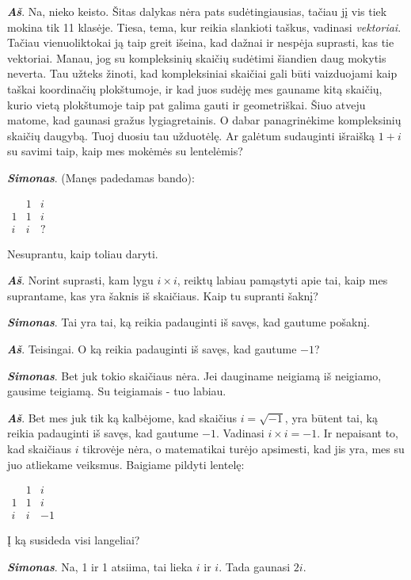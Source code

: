 \documentclass[a4paper]{article}
\newcommand{\say}[1]{\textbf{\textit{#1}}}
\begin{document}
\say{Aš}. Na, nieko keisto. Šitas dalykas nėra pats sudėtingiausias, tačiau jį vis tiek mokina tik 11 klasėje. Tiesa, tema, kur reikia slankioti taškus, vadinasi \textit{vektoriai}. Tačiau vienuoliktokai ją taip greit išeina, kad dažnai ir nespėja suprasti, kas tie vektoriai. Manau, jog su kompleksinių skaičių sudėtimi šiandien daug mokytis neverta. Tau užteks žinoti, kad kompleksiniai skaičiai gali būti vaizduojami kaip taškai koordinačių plokštumoje, ir kad juos sudėję mes gauname kitą skaičių, kurio vietą plokštumoje taip pat galima gauti ir geometriškai. Šiuo atveju matome, kad gaunasi gražus lygiagretainis. O dabar panagrinėkime kompleksinių skaičių daugybą. Tuoj duosiu tau užduotėlę. Ar galėtum sudauginti išraišką $1+i$ su savimi taip, kaip mes mokėmės su lentelėmis?

\say{Simonas}. (Manęs padedamas bando):

$\begin{array}{c||c|c}
 & 1 & i \\ \hline \hline
1 & 1 & i\\ \hline 
 i & i & ?
\end{array}$

Nesuprantu, kaip toliau daryti.

\say{Aš}. Norint suprasti, kam lygu $i \times i$, reiktų labiau pamąstyti apie tai, kaip mes suprantame, kas yra šaknis iš skaičiaus. Kaip tu supranti šaknį?

\say{Simonas}. Tai yra tai, ką reikia padauginti iš savęs, kad gautume pošaknį.

\say{Aš}. Teisingai. O ką reikia padauginti iš savęs, kad gautume $-1$? 

\say{Simonas}. Bet juk tokio skaičiaus nėra. Jei dauginame neigiamą iš neigiamo, gausime teigiamą. Su teigiamais - tuo labiau. 

\say{Aš}. Bet mes juk tik ką kalbėjome, kad skaičius $i=\sqrt{-1}$, yra būtent tai, ką reikia padauginti iš savęs, kad gautume $-1$.  Vadinasi $i\times i = -1$. Ir nepaisant to, kad skaičiaus $i$ tikrovėje nėra, o matematikai turėjo apsimesti, kad jis yra, mes su juo atliekame veiksmus. Baigiame pildyti lentelę:

$\begin{array}{c||c|c}
 & 1 & i \\ \hline \hline
1 & 1 & i\\ \hline 
 i & i & -1
\end{array}$

Į ką susideda visi langeliai?

\say{Simonas}. Na, 1 ir 1 atsiima, tai lieka $i$ ir $i$. Tada gaunasi $2i$. 
\end{document}
